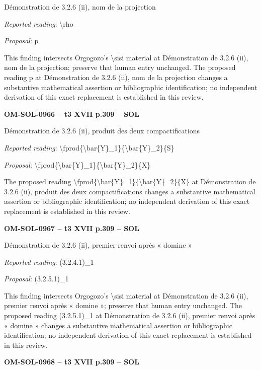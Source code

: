 Démonstration de 3.2.6 (ii), nom de la projection\par
\emph{Reported reading}: \textbackslash{}rho\par
\emph{Proposal}: p\par
This finding intersects Orgogozo's \textbackslash{}sisi material at Démonstration de 3.2.6 (ii), nom de la projection; preserve that human entry unchanged. The proposed reading p at Démonstration de 3.2.6 (ii), nom de la projection changes a substantive mathematical assertion or bibliographic identification; no independent derivation of this exact replacement is established in this review.\par
\par\noindent\textbf{OM-SOL-0966 -- t3 XVII p.309 -- SOL}\par
Démonstration de 3.2.6 (ii), produit des deux compactifications\par
\emph{Reported reading}: \textbackslash{}fprod\{\textbackslash{}bar\{Y\}\_1\}\{\textbackslash{}bar\{Y\}\_2\}\{S\}\par
\emph{Proposal}: \textbackslash{}fprod\{\textbackslash{}bar\{Y\}\_1\}\{\textbackslash{}bar\{Y\}\_2\}\{X\}\par
The proposed reading \textbackslash{}fprod\{\textbackslash{}bar\{Y\}\_1\}\{\textbackslash{}bar\{Y\}\_2\}\{X\} at Démonstration de 3.2.6 (ii), produit des deux compactifications changes a substantive mathematical assertion or bibliographic identification; no independent derivation of this exact replacement is established in this review.\par
\par\noindent\textbf{OM-SOL-0967 -- t3 XVII p.309 -- SOL}\par
Démonstration de 3.2.6 (ii), premier renvoi après « domine »\par
\emph{Reported reading}: (3.2.4.1)\_1\par
\emph{Proposal}: (3.2.5.1)\_1\par
This finding intersects Orgogozo's \textbackslash{}sisi material at Démonstration de 3.2.6 (ii), premier renvoi après « domine »; preserve that human entry unchanged. The proposed reading (3.2.5.1)\_1 at Démonstration de 3.2.6 (ii), premier renvoi après « domine » changes a substantive mathematical assertion or bibliographic identification; no independent derivation of this exact replacement is established in this review.\par
\par\noindent\textbf{OM-SOL-0968 -- t3 XVII p.309 -- SOL}\par
